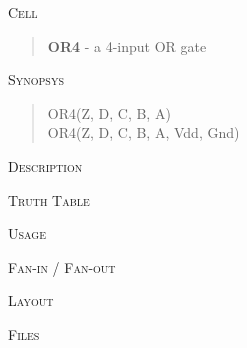 
\label{OR4}
\textsc{Cell}
\begin{quote}
    \textbf{OR4} - a 4-input OR gate
\end{quote}

\textsc{Synopsys}
\begin{quote}
    OR4(Z, D, C, B, A) \\
    OR4(Z, D, C, B, A, Vdd, Gnd)
\end{quote}

\textsc{Description}

%

\textsc{Truth Table}


\textsc{Usage}

\textsc{Fan-in / Fan-out}

\textsc{Layout}

\textsc{Files}
